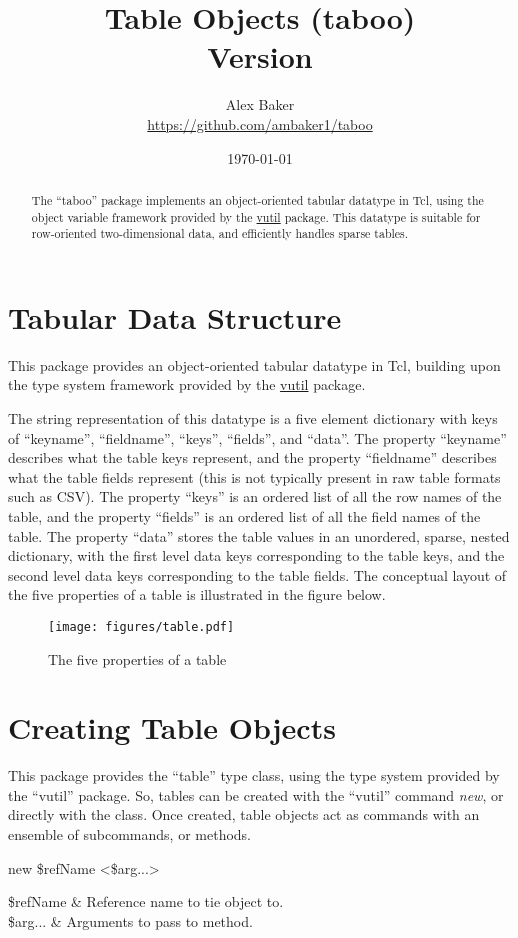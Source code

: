 \documentclass{article}
\title{\Huge{Table Objects (taboo)}\\\large Version \version}
\author{Alex Baker\\\small\url{https://github.com/ambaker1/taboo}}
\date{\small\today}
\begin{document}
\maketitle
\begin{abstract}
\begin{center}
The ``taboo'' package implements an object-oriented tabular datatype in Tcl, using the object variable framework provided by the \textcolor{blue}{\href{https://github.com/ambaker1/vutil}{vutil}} package.
This datatype is suitable for row-oriented two-dimensional data, and efficiently handles sparse tables. 
\end{center}
\end{abstract}
\clearpage


\section{Tabular Data Structure}
This package provides an object-oriented tabular datatype in Tcl, building upon the type system framework provided by the \textcolor{blue}{\href{https://github.com/ambaker1/vutil}{vutil}} package.

The string representation of this datatype is a five element dictionary with keys of ``keyname'', ``fieldname'', ``keys'', ``fields'', and ``data''. 
The property ``keyname'' describes what the table keys represent, and the property ``fieldname'' describes what the table fields represent (this is not typically present in raw table formats such as CSV). 
The property ``keys'' is an ordered list of all the row names of the table, and the property ``fields'' is an ordered list of all the field names of the table. 
The property ``data'' stores the table values in an unordered, sparse, nested dictionary, with the first level data keys corresponding to the table keys, and the second level data keys corresponding to the table fields. 
The conceptual layout of the five properties of a table is illustrated in the figure below.
\vspace{\baselineskip}
\FloatBarrier
\begin{figure}[!htb]
    \centering
    \texttt{[image: figures/table.pdf]}
    \caption{The five properties of a table}
    \label{fig:table_props}
\end{figure}
\clearpage
\section{Creating Table Objects}
This package provides the ``table'' type class, using the type system provided by the ``vutil'' package. 
So, tables can be created with the ``vutil'' command \textit{new}, or directly with the  class.
Once created, table objects act as commands with an ensemble of subcommands, or methods. 
\begin{syntax}
 new \$refName <\$arg...>
\end{syntax}
\begin{args}
\$refName & Reference name to tie object to. \\
\$arg... & Arguments to pass to  method.
\end{args}
\end{document}
